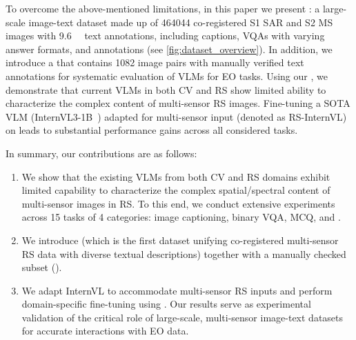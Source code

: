 To overcome the above-mentioned limitations, in this paper we present \bentxt: a large-scale image-text dataset made up of \num{464044} co-registered \acl{S1} \acl{SAR} and \acl{S2} \acl{MS} images with \SI{9.6}{\mega\nothing} text annotations, including captions, \acp{VQA} with varying answer formats, and \genDet{} annotations (see \cref{fig:dataset_overview}). In addition, we introduce a \bench{} that contains \num{1082} image pairs with manually verified text annotations for systematic evaluation of VLMs for EO tasks. Using our \bench{}, we demonstrate that current \acp{VLM} in both \ac{CV} and \ac{RS} show limited ability to characterize the complex content of multi-sensor \ac{RS} images. Fine-tuning a \ac{SOTA} \ac{VLM} (InternVL3-1B~\cite{zhu2025internvl3}) adapted for multi-sensor input (denoted as RS-InternVL) on \bentxt{} leads to substantial performance gains across all considered tasks.

In summary, our contributions are as follows:
\begin{enumerate}
    \item We show that the existing \acp{VLM} from both \ac{CV} and \ac{RS} domains exhibit limited capability to characterize the complex spatial/spectral content of multi-sensor images in \ac{RS}. To this end, we conduct extensive experiments across 15 tasks of 4 categories: image captioning, binary \ac{VQA}, \ac{MCQ}, and \genDet.
    \item We introduce \bentxt{} (which is the first dataset unifying co-registered multi-sensor \ac{RS} data with diverse textual descriptions) together with a manually checked subset (\bench{}).
    \item We adapt InternVL to accommodate multi-sensor RS inputs and perform domain-specific fine-tuning using \bentxt. Our results serve as experimental validation of the critical role of large-scale, multi-sensor image-text datasets for accurate interactions with EO data.
\end{enumerate}